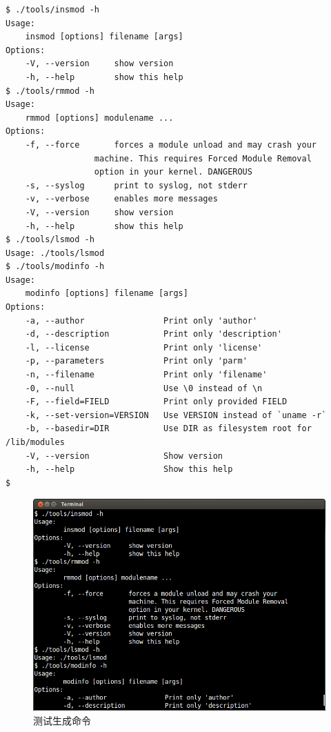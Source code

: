 \documentclass[11pt,a4paper]{article}
\makeatletter
\def\maxwidth{\ifdim\Gin@nat@width>\linewidth\linewidth
\else\Gin@nat@width\fi}
\let\Oldincludegraphics\includegraphics
\renewcommand{\includegraphics}[1]{\Oldincludegraphics[width=\maxwidth]{#1}}
\makeatother
\begin{document}
{\begin{shaded}\begin{verbatim}
$ ./tools/insmod -h
Usage:
    insmod [options] filename [args]
Options:
    -V, --version     show version
    -h, --help        show this help
$ ./tools/rmmod -h
Usage:
    rmmod [options] modulename ...
Options:
    -f, --force       forces a module unload and may crash your
                  machine. This requires Forced Module Removal
                  option in your kernel. DANGEROUS
    -s, --syslog      print to syslog, not stderr
    -v, --verbose     enables more messages
    -V, --version     show version
    -h, --help        show this help
$ ./tools/lsmod -h
Usage: ./tools/lsmod
$ ./tools/modinfo -h
Usage:
    modinfo [options] filename [args]
Options:
    -a, --author                Print only 'author'
    -d, --description           Print only 'description'
    -l, --license               Print only 'license'
    -p, --parameters            Print only 'parm'
    -n, --filename              Print only 'filename'
    -0, --null                  Use \0 instead of \n
    -F, --field=FIELD           Print only provided FIELD
    -k, --set-version=VERSION   Use VERSION instead of `uname -r`
    -b, --basedir=DIR           Use DIR as filesystem root for /lib/modules
    -V, --version               Show version
    -h, --help                  Show this help
$ 
\end{verbatim}\end{shaded}}
\begin{figure}[htbp]
\centering
\includegraphics{./pictures/1-5-test.png}
\caption{测试生成命令}
\end{figure}
\end{document}
